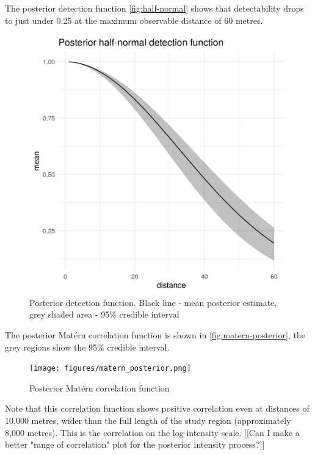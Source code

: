 \documentclass[preprint,12pt]{elsarticle}
\begin{document}
The posterior detection function \autoref{fig:half-normal} shows that detectability drops to just under 0.25 at the maximum observable distance of 60 metres.
\begin{figure}[h]
	\includegraphics[scale=0.6]{figures/halfnormal.png}
	\caption{Posterior detection function.  Black line - mean posterior estimate, grey shaded area - 95\% credible interval}
	\label{fig:half-normal}
\end{figure}

The posterior Mat\'ern correlation function is shown in \autoref{fig:matern-posterior}, the grey regions show the 95\% credible interval. 
\begin{figure}[h]
	\texttt{[image: figures/matern\_posterior.png]}
	\caption{Posterior Mat\'ern correlation function}
	\label{fig:matern-posterior}
\end{figure}
Note that this correlation function shows positive correlation even at distances of 10,000 metres, wider than the full length of the study region (approximately 8,000 metres).  This is the correlation on the log-intensity scale.  [[Can I make a better "range of correlation" plot for the posterior intensity process?]]
\end{document}
